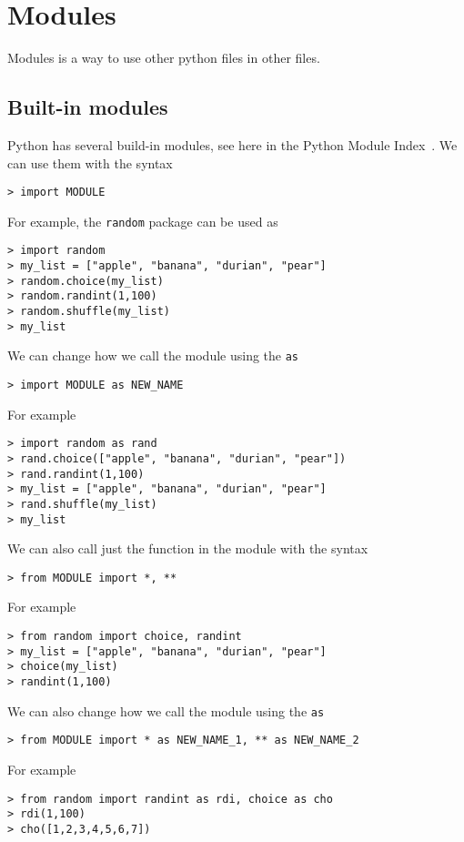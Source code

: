 
\section{Modules}

Modules is a way to use other python files in other files. 

\subsection{Built-in modules}

Python has several build-in modules, see here in the Python Module Index~\cite{python:index}. We can use them with the syntax 
\begin{verbatim}
> import MODULE
\end{verbatim}
For example, the \verb|random| package can be used as
\begin{verbatim}
> import random 
> my_list = ["apple", "banana", "durian", "pear"]
> random.choice(my_list)
> random.randint(1,100)
> random.shuffle(my_list)
> my_list
\end{verbatim}

We can change how we call the module using the \verb|as|
\begin{verbatim}
> import MODULE as NEW_NAME
\end{verbatim}
For example
\begin{verbatim}
> import random as rand
> rand.choice(["apple", "banana", "durian", "pear"])
> rand.randint(1,100)
> my_list = ["apple", "banana", "durian", "pear"]
> rand.shuffle(my_list)
> my_list
\end{verbatim}

We can also call just the function in the module with the syntax
\begin{verbatim}
> from MODULE import *, **
\end{verbatim}
For example
\begin{verbatim}
> from random import choice, randint
> my_list = ["apple", "banana", "durian", "pear"]
> choice(my_list)
> randint(1,100)
\end{verbatim}

We can also change how we call the module using the \verb|as|
\begin{verbatim}
> from MODULE import * as NEW_NAME_1, ** as NEW_NAME_2
\end{verbatim}
For example
\begin{verbatim}
> from random import randint as rdi, choice as cho
> rdi(1,100)
> cho([1,2,3,4,5,6,7])
\end{verbatim}

